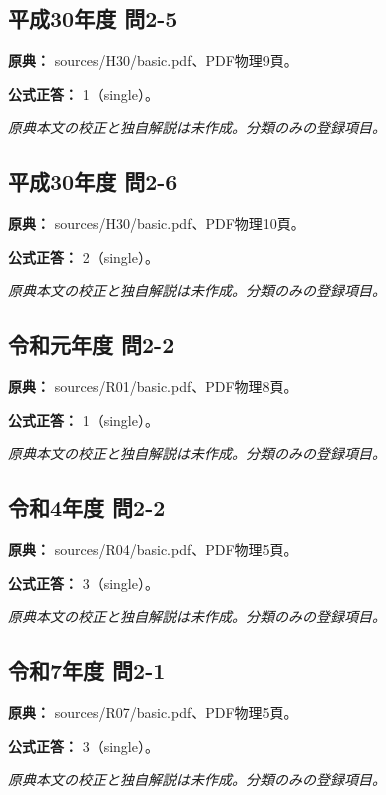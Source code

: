 \subsection{平成30年度 問2-5}
\label{q:h30-reg-basic-2-5}

\noindent\textbf{原典：} sources/H30/basic.pdf、PDF物理9頁。

\textbf{公式正答：} 1（single）。

\par\textit{原典本文の校正と独自解説は未作成。分類のみの登録項目。}

\subsection{平成30年度 問2-6}
\label{q:h30-reg-basic-2-6}

\noindent\textbf{原典：} sources/H30/basic.pdf、PDF物理10頁。

\textbf{公式正答：} 2（single）。

\par\textit{原典本文の校正と独自解説は未作成。分類のみの登録項目。}

\subsection{令和元年度 問2-2}
\label{q:r01-reg-basic-2-2}

\noindent\textbf{原典：} sources/R01/basic.pdf、PDF物理8頁。

\textbf{公式正答：} 1（single）。

\par\textit{原典本文の校正と独自解説は未作成。分類のみの登録項目。}

\subsection{令和4年度 問2-2}
\label{q:r04-reg-basic-2-2}

\noindent\textbf{原典：} sources/R04/basic.pdf、PDF物理5頁。

\textbf{公式正答：} 3（single）。

\par\textit{原典本文の校正と独自解説は未作成。分類のみの登録項目。}

\subsection{令和7年度 問2-1}
\label{q:r07-reg-basic-2-1}

\noindent\textbf{原典：} sources/R07/basic.pdf、PDF物理5頁。

\textbf{公式正答：} 3（single）。

\par\textit{原典本文の校正と独自解説は未作成。分類のみの登録項目。}
